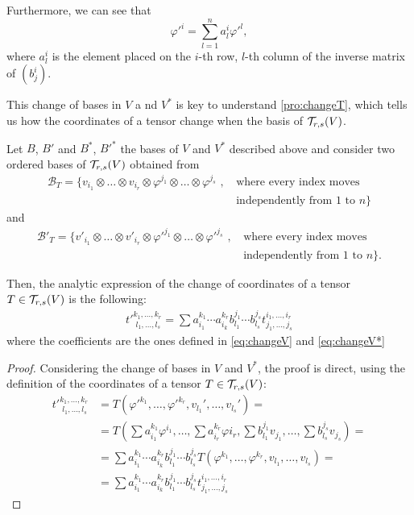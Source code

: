 Furthermore, we can see that
\begin{equation}
	\label{eq:changeV*}
	\varphi'^i = \sum_{l=1}^n a_l^i \varphi'^l,
\end{equation}
where $a_l^i$ is the element placed on the $i$-th row, $l$-th column of  the inverse matrix of $(b^i_j)$.

This change of bases in $V$ a nd $V^*$  is key to understand \autoref{pro:changeT}, which tells us how  the coordinates of a tensor change when the basis of ${\mathcal T}_{r,s}(V)$.

\begin{proposition}
	\label{pro:changeT}
	Let $B$, $B'$ and $B^*$, $B'^*$ the bases of $V$ and $V^*$ described above and consider two ordered bases of ${\mathcal T}_{r,s}(V)$ obtained from
	\begin{align*}
		\mathcal{B}_T = \{v_{i_1} \otimes \dots \otimes v_{i_r} \otimes \varphi^{j_1} \otimes \dots \otimes \varphi^{j_s} \textrm{ , } &\textrm{where every index moves} \\
		&\textrm{independently from $1$ to $n$}  \}
	\end{align*}
	and
	\begin{align*}
		\mathcal{B}'_T = \{v'_{i_1} \otimes \dots \otimes v'_{i_r} \otimes \varphi'^{j_1} \otimes \dots \otimes \varphi'^{j_s} \textrm{ , } &\textrm{where every index moves} \\
		&\textrm{independently from $1$ to $n$}  \}.
	\end{align*}
	
	Then, the analytic expression of the change of coordinates of a tensor $T \in {\mathcal T}_{r,s}(V)$ is the following:
	\begin{align*}
		t'^{k_1,\dots,k_r}_{\phantom{'}l_1,\dots,l_s} = \sum a_{i_1}^{k_1} \cdots a_{i_k}^{k_r} b_{l_1}^{j_1} \cdots b_{l_s}^{j_s} t_{j_1,\dots,j_s}^{i_1,\dots,i_r}
	\end{align*}
	where the coefficients are the ones defined in \autoref{eq:changeV} and \autoref{eq:changeV*}
\end{proposition}

\begin{proof}
	Considering the change of bases in $V$ and $V^*$, the proof is direct, using the definition of the coordinates of a tensor $T \in {\mathcal T}_{r,s}(V)$:
	\begin{align*}
		t'^{k_1,\dots,k_r}_{\phantom{'}l_1,\dots,l_s} &= T(\varphi'^{k_1}, \dots, \varphi'^{k_r}, v_{l_1}', \dots, v_{l_s}')  = \\
		&= T(\sum a_{i_1}^{k_1}\varphi^{i_1}, \dots, \sum a_{i_r}^{k_r}\varphi{i_r}, \sum b_{l_1}^{j_1} v_{j_1}, \dots, \sum b_{l_s}^{j_s} v_{j_s}) = \\
		&= \sum a_{i_1}^{k_1} \cdots a_{i_k}^{k_r} b_{l_1}^{j_1} \cdots b_{l_s}^{j_s} T(\varphi^{k_1}, \dots, \varphi^{k_r}, v_{l_1}, \dots, v_{l_s}) = \\
		&= \sum a_{i_1}^{k_1} \cdots a_{i_k}^{k_r} b_{l_1}^{j_1} \cdots b_{l_s}^{j_s} t_{j_1,\dots,j_s}^{i_1,\dots,i_r}
	\end{align*}
\end{proof}

